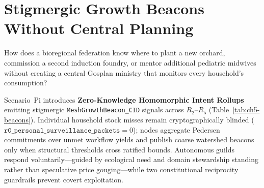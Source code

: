 \section{Stigmergic Growth Beacons Without Central Planning}
\label{sec:ch5-stigmergy}

How does a bioregional federation know where to plant a new orchard, commission a second induction
foundry, or mentor additional pediatric midwives without creating a central Gosplan ministry that
monitors every household's consumption?

Scenario~Pi introduces \textbf{Zero-Knowledge Homomorphic Intent Rollups} emitting stigmergic
\texttt{MeshGrowthBeacon\_CID} signals across $R_2\text{--}R_5$ (Table~\ref{tab:ch5-beacons}). Individual
household stock misses remain cryptographically blinded ($\mathtt{r0\_personal\_surveillance\_packets} = 0$);
nodes aggregate Pedersen commitments over unmet workflow yields and publish coarse watershed
beacons only when structural thresholds cross ratified bounds. Autonomous guilds respond
voluntarily---guided by ecological need and domain stewardship standing rather than speculative
price gouging---while two constitutional reciprocity guardrails prevent covert exploitation.

\begin{table}[htbp]
\centering
\caption{Zero-Knowledge Stigmergic \texttt{MeshGrowthBeacon\_CID} Signals and Reciprocity Guardrails}
\label{tab:ch5-beacons}
\footnotesize
{}
\end{table}

